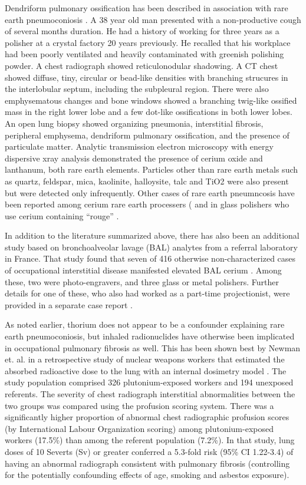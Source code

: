 \documentclass[a4paper,12pt]{article}
\begin{document}
Dendriform pulmonary ossification has been described in association with rare earth pneumoconiosis \cite{Yoon2005}. A 38 year old man presented with a non-productive cough of several months duration. He had a history of working for three years as a polisher at a crystal factory 20 years previously. He recalled that his workplace had been poorly ventilated and heavily contaminated with greenish polishing powder. A chest radiograph showed reticulonodular shadowing. A CT chest showed diffuse, tiny, circular or bead-like densities with branching strucures in the interlobular septum, including the subpleural region. There were also emphysematous changes and bone windows showed a branching twig-like ossified mass in the right lower lobe and a few dot-like ossifications in both lower lobes. An open lung biopsy showed organizing pneumonia, interstitial fibrosis, peripheral emphysema, dendriform pulmonary ossification, and the presence of particulate matter. Analytic transmission electron microscopy with energy dispersive xray analysis demonstrated the presence of cerium oxide and lanthanum, both rare earth elements. Particles other than rare earth metals such as quartz, feldspar, mica, kaolinite, halloysite, talc and TiO2 were also present but were detected only infrequently. Other cases of rare earth pneumncosis have been reported among cerium rare earth processers (\cite{Husain1980,Nappee1972} and in glass polishers who use cerium containing “rouge” \cite{le1979raguenaud}. 

In addition to the literature summarized above, there has also been an additional study based on bronchoalveolar lavage (BAL) analytes from a referral laboratory in France. That study found that seven of 416 otherwise non-characterized cases of occupational interstitial disease manifested elevated BAL cerium \cite{Pairon1994}. Among these, two were photo-engravers, and three glass or metal polishers. Further details for one of these, who also had worked as a part-time projectionist, were provided in a separate case report \cite{Pairon1995,Husain1980}.

As noted earlier, thorium does not appear to be a confounder explaining rare earth pneumoconiosis, but inhaled radionuclides have otherwise been implicated in occupational pulmonary fibrosis as well. This has been shown best by Newman et. al. in a retrospective study of nuclear weapons workers that  estimated the absorbed radioactive dose to the lung with an internal dosimetry model \cite{Newman2005}. The study population comprised 326 plutonium-exposed workers and 194 unexposed referents. The severity of chest radiograph interstitial abnormalities between the two groups was compared using the profusion scoring system. There was a significantly higher proportion of abnormal chest radiographic profusion scores (by International Labour Organization scoring) among plutonium-exposed workers (17.5\%) than among the referent population (7.2\%). In that study, lung doses of 10 Severts (Sv) or greater conferred a 5.3-fold risk (95\% CI 1.22-3.4) of having an abnormal radiograph consistent with pulmonary fibrosis (controlling for the potentially confounding effects of age, smoking and asbestos exposure).
\end{document}
